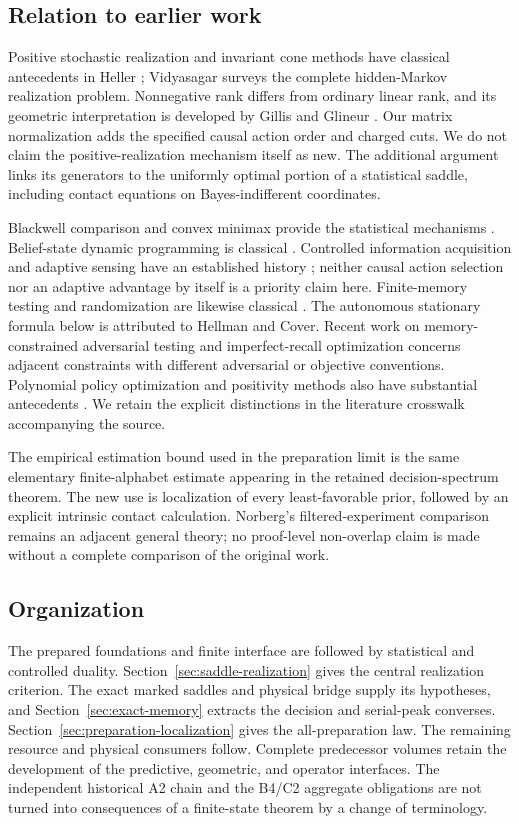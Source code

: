 \documentclass[11pt]{amsart}
\theoremstyle{definition}\newtheorem{definition}[theorem]{Definition}
\theoremstyle{remark}\newtheorem{remark}[theorem]{Remark}
\newcommand{\1}{\mathbf 1}
\begin{document}
\subsection{Relation to earlier work}
Positive stochastic realization and invariant cone methods have classical
antecedents in Heller \cite{Heller}; Vidyasagar \cite{Vidyasagar} surveys
the complete hidden-Markov realization problem. Nonnegative rank differs
from ordinary linear rank, and its geometric interpretation is developed
by Gillis and Glineur \cite{GG}. Our matrix normalization adds the
specified causal action order and charged cuts. We do not claim the
positive-realization mechanism itself as new. The additional argument
links its generators to the uniformly optimal portion of a statistical
saddle, including contact equations on Bayes-indifferent coordinates.

Blackwell comparison and convex minimax provide the statistical
mechanisms \cite{Blackwell,Sion}. Belief-state dynamic programming is
classical \cite{SmallwoodSondik}. Controlled information acquisition and
adaptive sensing have an established history
\cite{Chernoff,NJ,NAV}; neither causal action selection nor an adaptive
advantage by itself is a priority claim here. Finite-memory testing and
randomization are likewise classical \cite{HC,HCrandom,FH,CFH}. The
autonomous stationary formula below is attributed to Hellman and Cover.
Recent work on memory-constrained adversarial testing \cite{MP} and
imperfect-recall optimization \cite{ZSV} concerns adjacent constraints
with different adversarial or objective conventions. Polynomial policy
optimization and positivity methods also have substantial antecedents
\cite{MM,Putinar}. We retain the explicit distinctions in the literature
crosswalk accompanying the source.

The empirical estimation bound used in the preparation limit is the
same elementary finite-alphabet estimate appearing in the retained
decision-spectrum theorem. The new use is localization of every
least-favorable prior, followed by an explicit intrinsic contact
calculation. Norberg's filtered-experiment comparison \cite{Norberg}
remains an adjacent general theory; no proof-level non-overlap claim is
made without a complete comparison of the original work.

\subsection{Organization}
The prepared foundations and finite interface are followed by statistical
and controlled duality. Section~\ref{sec:saddle-realization} gives the
central realization criterion. The exact marked saddles and physical
bridge supply its hypotheses, and Section~\ref{sec:exact-memory}
extracts the decision and serial-peak converses. Section~\ref{sec:preparation-localization}
gives the all-preparation law. The remaining resource and physical
consumers follow. Complete predecessor volumes retain the development
of the predictive, geometric, and operator interfaces. The independent
historical A2 chain and the B4/C2 aggregate obligations are not turned
into consequences of a finite-state theorem by a change of terminology.
\end{document}
